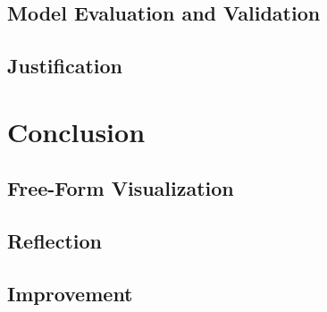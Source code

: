 \documentclass[11pt, a4paper, onecolumn]{article}
\begin{document}
\subsection{Model Evaluation and Validation}
\subsection{Justification}
\section{Conclusion}
\subsection{Free-Form Visualization}
\subsection{Reflection}
\subsection{Improvement}


{}
\end{document}
